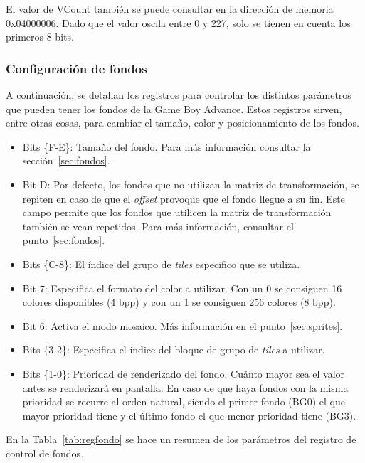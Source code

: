 El valor de VCount también se puede consultar en la dirección de memoria 0x04000006. Dado que el valor oscila entre 0 y 227, solo se tienen en cuenta los primeros 8 bits.

\subsubsection{Configuración de fondos}\label{sec:conf_fondos}

A continuación, se detallan los registros para controlar los distintos parámetros que pueden tener los fondos de la Game Boy Advance. Estos registros sirven, entre otras cosas, para cambiar el tamaño, color y posicionamiento de los fondos.

\begin{itemize}
	\item Bits \{F-E\}: Tamaño del fondo. Para más información consultar la sección~\ref{sec:fondos}.
	\item Bit {D}: Por defecto, los fondos que no utilizan la matriz de transformación, se repiten en caso de que el \textit{offset} provoque que el fondo llegue a su fin. Este campo permite que los fondos que utilicen la matriz de transformación también se vean repetidos. Para más información, consultar el punto~\ref{sec:fondos}.
	\item Bits \{C-8\}: El índice del grupo de \textit{tiles} especifico que se utiliza.
	\item Bit {7}: Especifica el formato del color a utilizar. Con un 0 se consiguen 16 colores disponibles (4 bpp) y con un 1 se consiguen 256 colores (8 bpp).
	\item Bit {6}: Activa el modo mosaico. Más información en el punto~\ref{sec:sprites}.
	\item Bits \{3-2\}: Especifica el índice del bloque de grupo de \textit{tiles} a utilizar.
	\item Bits \{1-0\}: Prioridad de renderizado del fondo. Cuánto mayor sea el valor antes se renderizará en pantalla. En caso de que haya fondos con la misma prioridad se recurre al orden natural, siendo el primer fondo (BG0) el que mayor prioridad tiene y el último fondo el que menor prioridad tiene (BG3).
\end{itemize}

En la Tabla~\ref{tab:regfondo} se hace un resumen de los parámetros del registro de control de fondos.

